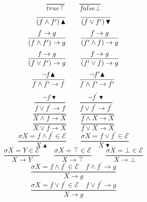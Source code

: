 \begin{equation*}
\frac{{}}{true\top }\qquad \frac{{}}{false\bot }
\end{equation*}%
\begin{equation*}
\frac{{}}{\left( f\wedge f^{\prime }\right) \blacktriangle }\qquad \frac{{}}{%
\left( f\vee f^{\prime }\right) \blacktriangledown }
\end{equation*}%
\begin{equation*}
\frac{f\rightarrow g}{(f\wedge f^{\prime })\rightarrow g}\qquad \frac{%
f\rightarrow g}{(f^{\prime }\wedge f)\rightarrow g}
\end{equation*}%
\begin{equation*}
\frac{f\rightarrow g}{(f\vee f^{\prime })\rightarrow g}\qquad \frac{%
f\rightarrow g}{(f^{\prime }\vee f)\rightarrow g}
\end{equation*}%
\begin{equation*}
\frac{\lnot f\blacktriangle }{f\wedge f^{\prime }\rightarrow f}\qquad \frac{%
\lnot f^{\prime }\blacktriangle }{f\wedge f^{\prime }\rightarrow f^{\prime }}
\end{equation*}%
\begin{equation*}
\frac{\lnot f\blacktriangledown }{f\vee f^{\prime }\rightarrow f}\qquad 
\frac{\lnot f^{\prime }\blacktriangledown }{f\vee f^{\prime }\rightarrow
f^{\prime }}
\end{equation*}%
\begin{equation*}
\frac{{}}{X\wedge f\rightarrow X}\qquad \frac{{}}{f\wedge X\rightarrow X}
\end{equation*}%
\begin{equation*}
\frac{{}}{X\vee f\rightarrow X}\qquad \frac{{}}{f\vee X\rightarrow X}
\end{equation*}%
\begin{equation*}
\frac{\sigma X=f\wedge f^{\prime }\in \mathcal{E}}{X\blacktriangle }\qquad 
\frac{\sigma X=f\vee f^{\prime }\in \mathcal{E}}{X\blacktriangledown }
\end{equation*}%
\begin{equation*}
\frac{\sigma X=Y\in \mathcal{E}}{X\rightarrow Y}\qquad \frac{\sigma X=\top
\in \mathcal{E}}{X\rightarrow \top }\qquad \frac{\sigma X=\bot \in \mathcal{E%
}}{X\rightarrow \bot }
\end{equation*}%
\begin{equation*}
\frac{\sigma X=f\wedge f^{\prime }\in \mathcal{E}\quad f\wedge f^{\prime
}\rightarrow g}{X\rightarrow g}
\end{equation*}%
\begin{equation*}
\frac{\sigma X=f\vee f^{\prime }\in \mathcal{E}\quad f\vee f^{\prime
}\rightarrow g}{X\rightarrow g}
\end{equation*}%
